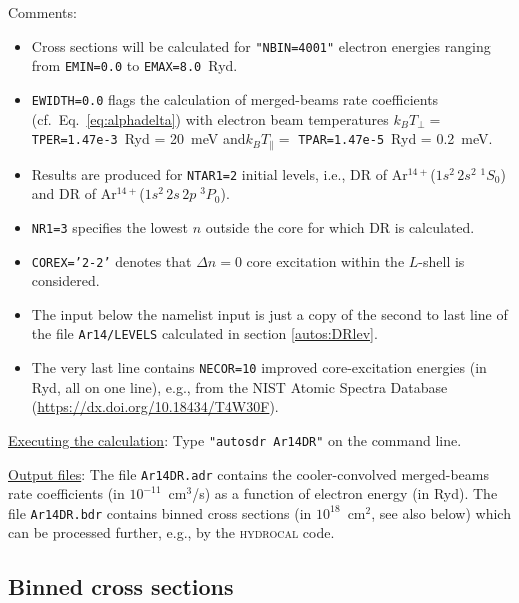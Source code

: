 \documentclass[a4paper,12pt]{article}
\begin{document}
Comments:
\begin{itemize}
\item Cross sections will be calculated for \texttt{"NBIN=4001"} electron energies ranging from \texttt{EMIN=0.0} to \texttt{EMAX=8.0}~Ryd.
\item \texttt{EWIDTH=0.0} flags the calculation of merged-beams rate coefficients (cf.~Eq.~\ref{eq:alphadelta}) with electron beam temperatures $k_BT_\perp=$ \texttt{TPER=1.47e-3}~Ryd = 20~meV and\newline $k_BT_\| = $ \texttt{TPAR=1.47e-5}~Ryd = 0.2~meV.
\item Results are produced for \texttt{NTAR1=2} initial levels, i.e., DR of Ar$^{14+}$($1s^2\,2s^2\;^1S_0$) and DR of Ar$^{14+}$($1s^2\,2s\,2p\;^3P_0$).
\item \texttt{NR1=3} specifies the lowest $n$ outside the core for which DR is calculated.
\item \texttt{COREX='2-2'} denotes that $\Delta n=0$ core excitation within the $L$-shell is considered.
\item The input below the namelist input is just a copy of the second to last line of the file \texttt{Ar14/LEVELS} calculated in section \ref{autos:DRlev}.
\item The very last line contains \texttt{NECOR=10} improved core-excitation energies (in Ryd, all on one line), e.g., from the NIST Atomic Spectra Database (\url{https://dx.doi.org/10.18434/T4W30F}).
\end{itemize}

\underline{Executing the calculation}: Type \texttt{"autosdr Ar14DR"} on the command line.

\underline{Output files}: The file \texttt{Ar14DR.adr} contains the cooler-convolved merged-beams rate coefficients (in $10^{-11}$~cm$^3$/s) as a function of electron energy (in Ryd). The file \texttt{Ar14DR.bdr} contains binned cross sections (in $10^{18}$~cm$^2$, see also below) which can be processed further, e.g., by the \textsc{hydrocal} code.

\newpage
\subsection{Binned cross sections}
\end{document}

